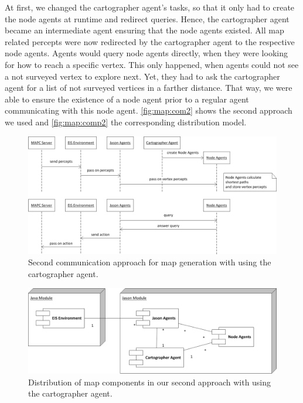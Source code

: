 At first, we changed the cartographer agent's tasks, so that it only had to create the node agents at runtime and redirect queries.
Hence, the cartographer agent became an intermediate agent ensuring that the node agents existed.
All map related percepts were now redirected by the cartographer agent to the respective node agents.
Agents would query node agents directly, when they were looking for how to reach a specific vertex.
This only happened, when agents could not see a not surveyed vertex to explore next.
Yet, they had to ask the cartographer agent for a list of not surveyed vertices in a farther distance.
That way, we were able to ensure the existence of a node agent prior to a regular agent communicating with this node agent.
\autoref{fig:map:com2} shows the second approach we used and \autoref{fig:map:comp2} the corresponding distribution model.
\begin{figure}
  \centering
  \includegraphics[width=\linewidth]{images/map_com_2.png}
  \caption{Second communication approach for map generation with using the cartographer agent.}
  \label{fig:map:com2}
\end{figure}

\begin{figure}
  \centering
  \includegraphics[width=\linewidth]{images/map_comp_2.png}
  \caption{Distribution of map components in our second approach with using the cartographer agent.}
  \label{fig:map:comp2}
\end{figure}

